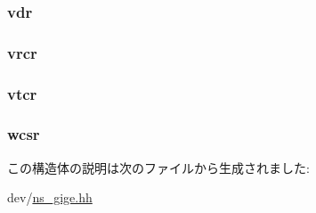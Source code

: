 \label{structdp__regs_a5644814c8086c13ab436442d928f3762}
\hypertarget{structdp__regs_aec24fe04cbf42b0857c04266cb51c2ca}{
\subsubsection[{vdr}]{ {\bf vdr}}}
\label{structdp__regs_aec24fe04cbf42b0857c04266cb51c2ca}
\hypertarget{structdp__regs_a664e8e5a5473719e41394f1694613b89}{
\subsubsection[{vrcr}]{ {\bf vrcr}}}
\label{structdp__regs_a664e8e5a5473719e41394f1694613b89}
\hypertarget{structdp__regs_ab0d92d87494fe3945a73cc33dea5862b}{
\subsubsection[{vtcr}]{ {\bf vtcr}}}
\label{structdp__regs_ab0d92d87494fe3945a73cc33dea5862b}
\hypertarget{structdp__regs_a5d0efa243cad936d51e851faa8b2077c}{
\subsubsection[{wcsr}]{ {\bf wcsr}}}
\label{structdp__regs_a5d0efa243cad936d51e851faa8b2077c}


この構造体の説明は次のファイルから生成されました:\begin{DoxyCompactItemize}
\item 
dev/\hyperlink{ns__gige_8hh}{ns\_\-gige.hh}\end{DoxyCompactItemize}

